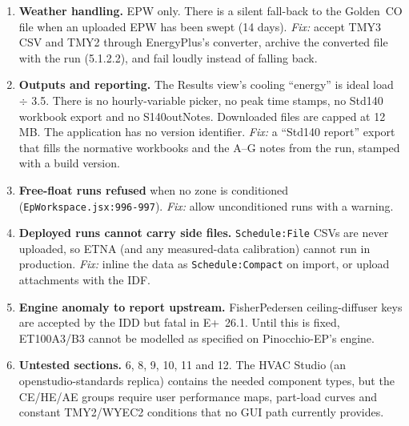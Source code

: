 \documentclass[10pt,a4paper]{article}
\newcommand{\code}[1]{\texttt{\small #1}}
\begin{document}
\begin{enumerate}[label=\textbf{N\arabic*.},leftmargin=2.4em]
0.7 (\code{constructionLib.js:234-262}); re-assigning a construction wipes material edits; ideal loads with
dehumidification at SHR~0.7 (Standard~140 requires no latent extraction); Solar Distribution FullExterior;
RunPeriod DST and holidays on. \emph{Fix:} a ``Standard~140 / validation'' project profile that sets the
specification values and records them.
\item \textbf{Weather handling.} EPW only. There is a silent fall-back to the Golden~CO file when an uploaded EPW
has been swept (14 days). \emph{Fix:} accept TMY3 CSV and TMY2 through EnergyPlus's converter, archive the
converted file with the run (5.1.2.2), and fail loudly instead of falling back.
\item \textbf{Outputs and reporting.} The Results view's cooling ``energy'' is ideal load $\div$ 3.5. There is no
hourly-variable picker, no peak time stamps, no Std140 workbook export and no S140outNotes. Downloaded files are
capped at 12\,MB. The application has no version identifier. \emph{Fix:} a ``Std140 report'' export that fills the
normative workbooks and the A--G notes from the run, stamped with a build version.
\item \textbf{Free-float runs refused} when no zone is conditioned (\code{EpWorkspace.jsx:996-997}).
\emph{Fix:} allow unconditioned runs with a warning.
\item \textbf{Deployed runs cannot carry side files.} \code{Schedule:File} CSVs are never uploaded, so ETNA (and any
measured-data calibration) cannot run in production. \emph{Fix:} inline the data as \code{Schedule:Compact} on
import, or upload attachments with the IDF.
\item \textbf{Engine anomaly to report upstream.} FisherPedersen ceiling-diffuser keys are accepted by the IDD
but fatal in E+~26.1. Until this is fixed, ET100A3/B3 cannot be modelled as specified on Pinocchio-EP's engine.
\item \textbf{Untested sections.} 6, 8, 9, 10, 11 and 12. The HVAC Studio (an openstudio-standards replica) contains
the needed component types, but the CE/HE/AE groups require user performance maps, part-load curves and constant
TMY2/WYEC2 conditions that no GUI path currently provides.
\end{enumerate}
\end{document}
